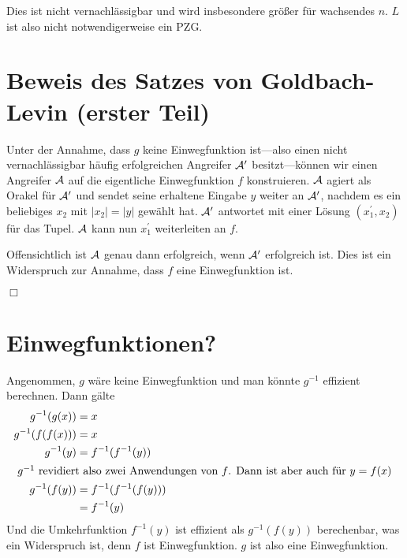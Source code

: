 \documentclass{../crypto}
\begin{document}
Dies ist nicht vernachlässigbar und wird insbesondere größer für wachsendes $n$.
$L$ ist also nicht notwendigerweise ein PZG.

\section{Beweis des Satzes von Goldbach-Levin (erster Teil)}

Unter der Annahme, dass $g$ keine Einwegfunktion ist---also einen nicht
vernachlässigbar häufig erfolgreichen Angreifer $\mathcal{A}^\prime$
besitzt---können wir einen Angreifer $\mathcal{A}$ auf die eigentliche
Einwegfunktion $f$ konstruieren. $\mathcal{A}$ agiert als Orakel für
$\mathcal{A}^\prime$ und sendet seine erhaltene Eingabe $y$ weiter an
$\mathcal{A}^\prime$, nachdem es ein beliebiges $x_2$ mit $|x_2| = |y|$ gewählt
hat. $\mathcal{A}^\prime$ antwortet mit einer Lösung $(x_1^\prime,x_2)$ für das
Tupel. $\mathcal{A}$ kann nun $x_1^\prime$  weiterleiten an $f$. 

\begin{center}
\end{center}

Offensichtlich ist $\mathcal{A}$ genau dann
erfolgreich, wenn $\mathcal{A}^\prime$ erfolgreich ist. Dies ist ein Widerspruch
zur Annahme, dass $f$ eine Einwegfunktion ist.

\hfill{}$\Box$


\section{Einwegfunktionen?}

Angenommen, $g$ wäre keine Einwegfunktion und man könnte $g^{-1}$ effizient
berechnen. Dann gälte 
\begin{align*}
   g^{-1}(g(x)) &= x \\
   g^{-1}(f(f(x))) &= x \\
   g^{-1}(y) &= f^{-1}(f^{-1}(y)) \\
   \intertext{
      $g^{-1}$ revidiert also zwei Anwendungen von $f$. Dann ist aber auch
      für $y=f(x)$
   }
   g^{-1}(f(y)) &= f^{-1}(f^{-1}(f(y))) \\
                &= f^{-1}(y)
\end{align*}
Und die Umkehrfunktion $f^{-1}(y)$ ist effizient als $g^{-1}(f(y))$ berechenbar,
was ein Widerspruch ist, denn $f$ ist Einwegfunktion. $g$ ist also eine
Einwegfunktion.
\end{document}
